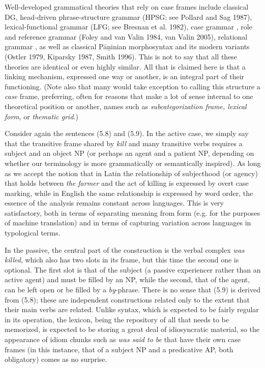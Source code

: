 Well-developed grammatical theories that rely on case frames include classical
DG, head-driven phrase-structure grammar (HPSG; see Pollard and Sag 1987),
\nocite{Pollard:1987} lexical-functional grammar (LFG; see Bresnan et
al. 1982),\nocite{Bresnan:1982} case grammar \cite{Fillmore:1968}, role and
reference grammar (Foley and van Valin 1984, van Valin
2005),\nocite{Foley:1984}\nocite{Valin:2005} relational grammar
\cite{Perlmutter:1983}, as well as classical P\={a}\d{n}inian morphosyntax and
its modern variants (Ostler 1979, Kiparsky 1987, Smith 1996).
\nocite{Ostler:1979} \nocite{Kiparsky:1987} \nocite{Smith:1996} This is not to
say that all these theories are identical or even highly similar. All that is
claimed here is that a linking mechanism, expressed one way or another, is an
integral part of their functioning. (Note also that many would take exception
to calling this structure a {\it case} frame, preferring, often for reasons
that make a lot of sense internal to one theoretical position or another,
names such as {\it subcategorization frame, lexical form}, or {\it thematic
  grid}.)

Consider again the sentences (5.8) and (5.9). In the active case, we simply
say that the transitive frame shared by {\it kill} and many transitive verbs
requires a subject and an object NP (or perhaps an agent and a patient NP,
depending on whether our terminology is more grammatically or semantically
inspired). As long as we accept the notion that in Latin the relationship of
subjecthood (or agency) that holds between {\it the farmer} and the act of
killing is expressed by overt case marking, while in English the same
relationship is expressed by word order, the essence of the analysis remains
constant across languages.  This is very satisfactory, both in terms of
separating meaning from form (e.g.  for the purposes of machine translation)
and in terms of capturing variation across languages in typological terms.

In the passive, the central part of the construction is the verbal complex
{\it was killed}, which also has two slots in its frame, but this time the
second one is optional. The first slot is that of the subject (a passive
experiencer rather than an active agent) and must be filled by an NP, while
the second, that of the agent, can be left open or be filled by a {\it
  by}-phrase. There is no sense that (5.9) is derived from (5.8); these are
independent constructions related only to the extent that their main verbs are
related. Unlike syntax, which is expected to be fairly regular in its
operation, the lexicon, being the repository of all that needs to be
memorized, is expected to be storing a great deal of idiosyncratic material,
so the appearance of idiom chunks such as {\it was said to be} that have
their own case frames (in this instance, that of a subject NP and a
predicative AP, both obligatory) comes as no surprise.


